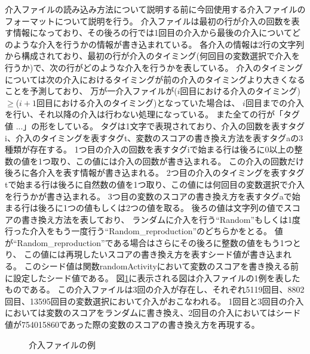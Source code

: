 介入ファイルの読み込み方法について説明する前に今回使用する介入ファイルのフォーマットについて説明を行う。
介入ファイルは最初の行が介入の回数を表す情報になっており、その後ろの行では1回目の介入から最後の介入についてどのような介入を行うかの情報が書き込まれている。
各介入の情報は2行の文字列から構成されており、最初の行が介入のタイミング(何回目の変数選択で介入を行うか)で、次の行がどのような介入を行うかを表している。
介入のタイミングについては次の介入におけるタイミングが前の介入のタイミングより大きくなることを予測しており、
万が一介入ファイルが($i$回目における介入のタイミング)$\geq$($i+1$回目における介入のタイミング)となっていた場合は、
$i$回目までの介入を行い、それ以降の介入は行わない処理になっている。
また全ての行が「タグ 値 ...」の形をしている。
タグは1文字で表現されており、介入の回数を表すタグi、介入のタイミングを表すタグt、変数のスコアの書き換え方法を表すタグaの3種類が存在する。
1つ目の介入の回数を表すタグiで始まる行は後ろに0以上の整数の値を1つ取り、この値には介入の回数が書き込まれる。
この介入の回数だけ後ろに各介入を表す情報が書き込まれる。
2つ目の介入のタイミングを表すタグtで始まる行は後ろに自然数の値を1つ取り、この値には何回目の変数選択で介入を行うかが書き込まれる。
3つ目の変数のスコアの書き換え方を表すタグaで始まる行は後ろに1つの値もしくは2つの値を取る。
後ろの値は文字列の値でスコアの書き換え方法を表しており、
ランダムに介入を行う``Random''もしくは1度行った介入をもう一度行う``Random\_reproduction''のどちらかをとる。
値が``Random\_reproduction''である場合はさらにその後ろに整数の値をもう1つとり、
この値には再現したいスコアの書き換え方を表すシード値が書き込まれる。
このシード値は関数randomActivityにおいて変数のスコアを書き換える前に設定したシード値である。
図\ref{fig:介入ファイルの例}に表示される図は介入ファイルの1例を表したものである。
この介入ファイルは3回の介入が存在し、それぞれ5119回目、8802回目、13595回目の変数選択において介入がおこなわれる。
1回目と3回目の介入においては変数のスコアをランダムに書き換え、2回目の介入においてはシード値が754015860であった際の変数のスコアの書き換え方を再現する。
\begin{figure}[t]
   	\caption{介入ファイルの例}
	\label{fig:介入ファイルの例}
\end{figure}

